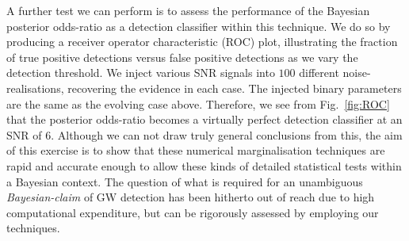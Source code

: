 \documentclass[twocolappendix,tighten]{emulateapj}
\newcommand{\incgraph}[3]{\texttt{[image: \#3]}}
\begin{document}
A further test we can perform is to assess the performance of the Bayesian posterior odds-ratio as a detection classifier within this technique. We do so by producing a receiver operator characteristic (ROC) plot, illustrating the fraction of true positive detections versus false positive detections as we vary the detection threshold. We inject various SNR signals into $100$ different noise-realisations, recovering the evidence in each case. The injected binary parameters are the same as the evolving case above. Therefore, we see from Fig.\ \ref{fig:ROC} that the posterior odds-ratio becomes a virtually perfect detection classifier at an SNR of $6$. Although we can not draw truly general conclusions from this, the aim of this exercise is to show that these numerical marginalisation techniques are rapid and accurate enough to allow these kinds of detailed statistical tests within a Bayesian context. The question of what is required for an unambiguous {\it Bayesian-claim} of GW detection has been hitherto out of reach due to high computational expenditure, but can be rigorously assessed by employing our techniques.



\end{document}
